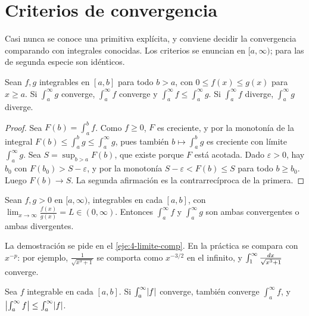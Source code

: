 \section{Criterios de convergencia}

Casi nunca se conoce una primitiva explícita, y conviene decidir la convergencia comparando con integrales conocidas. Los criterios se enuncian en $[a,\infty)$; para las de segunda especie son idénticos.

\begin{teorema}\label{teo:comparacion-int}
Sean $f,g$ integrables en $[a,b]$ para todo $b>a$, con $0\le f(x)\le g(x)$ para $x\ge a$. Si $\int_a^{\infty}g$ converge, $\int_a^{\infty}f$ converge y $\int_a^{\infty}f\le\int_a^{\infty}g$. Si $\int_a^{\infty}f$ diverge, $\int_a^{\infty}g$ diverge.
\end{teorema}

\begin{proof}
Sea $F(b)=\int_a^{b}f$. Como $f\ge0$, $F$ es creciente, y por la monotonía de la integral $F(b)\le\int_a^{b}g\le\int_a^{\infty}g$, pues también $b\mapsto\int_a^b g$ es creciente con límite $\int_a^\infty g$. Sea $S=\sup_{b>a}F(b)$, que existe porque $F$ está acotada. Dado $\varepsilon>0$, hay $b_0$ con $F(b_0)>S-\varepsilon$, y por la monotonía $S-\varepsilon<F(b)\le S$ para todo $b\ge b_0$. Luego $F(b)\to S$. La segunda afirmación es la contrarrecíproca de la primera.
\end{proof}

\begin{teorema}\label{teo:comparacion-limite}
Sean $f,g>0$ en $[a,\infty)$, integrables en cada $[a,b]$, con $\lim_{x\to\infty}\frac{f(x)}{g(x)}=L\in(0,\infty)$. Entonces $\int_a^{\infty}f$ y $\int_a^{\infty}g$ son ambas convergentes o ambas divergentes.
\end{teorema}

La demostración se pide en el \cref{eje:4-limite-comp}. En la práctica se compara con $x^{-p}$: por ejemplo, $\frac{1}{\sqrt{x^{3}+1}}$ se comporta como $x^{-3/2}$ en el infinito, y $\int_1^{\infty}\frac{\mathop{}\!d x}{\sqrt{x^{3}+1}}$ converge.

\begin{teorema}\label{teo:absoluta-int}
Sea $f$ integrable en cada $[a,b]$. Si $\int_a^{\infty}\lvert f\rvert$ converge, también converge $\int_a^{\infty}f$, y $\bigl|\int_a^{\infty}f\bigr|\le\int_a^{\infty}\lvert f\rvert$.
\end{teorema}


